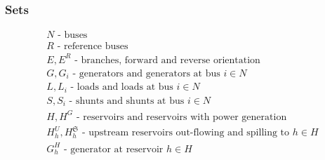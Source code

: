 \documentclass{juliacon}
\begin{document}
\subsubsection*{Sets}
\begin{align*}
%
& N \mbox{ - buses}\nonumber \\
& R \mbox{ - reference buses}\nonumber \\
& E, E^R \mbox{ - branches, forward and reverse orientation} \nonumber \\
& G, G_i \mbox{ - generators and generators at bus $i \in N$} \nonumber \\
& L, L_i \mbox{ - loads and loads at bus $i \in N$} \nonumber \\
& S, S_i \mbox{ - shunts and shunts at bus $i \in N$} \nonumber \\
& H, H^G \mbox{ - reservoirs and reservoirs with power generation}\nonumber \\
& H^U_h, H^{\mathfrak{S}}_h \mbox{ - upstream reservoirs out-flowing and spilling to $h\in H$ }\nonumber \\
& G^H_h \mbox{ - generator at reservoir $h\in H$}\nonumber \\
%
\end{align*}
\end{document}
